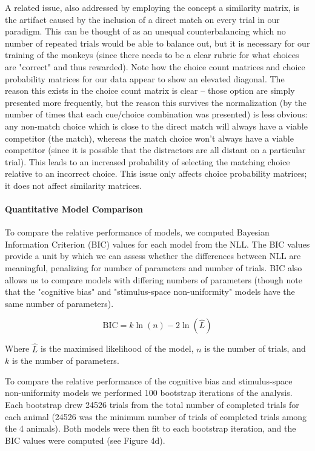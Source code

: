 \documentclass[9pt,biorxiv,lineno,onehalfspacing]{lapreprint}
\begin{document}
\begin{refsection}
A related issue, also addressed by employing the concept a similarity matrix, is the artifact caused by the inclusion of a direct match on every trial in our paradigm. 
This can be thought of as an unequal counterbalancing which no number of repeated trials would be able to balance out, but it is necessary for our training of the monkeys (since there needs to be a clear rubric for what choices are "correct" and thus rewarded).
Note how the choice count matrices and choice probability matrices for our data appear to show an elevated diagonal. 
The reason this exists in the choice count matrix is clear – those option are simply presented more frequently, but the reason this survives the normalization (by the number of times that each cue/choice combination was presented) is less obvious: any non-match choice which is close to the direct match will always have a viable competitor (the match), whereas the match choice won't always have a viable competitor (since it is possible that the distractors are all distant on a particular trial).
This leads to an increased probability of selecting the matching choice relative to an incorrect choice. This issue only affects choice probability matrices; it does not affect similarity matrices.

\paragraph{Quantitative Model Comparison}
To compare the relative performance of models, we computed Bayesian Information Criterion (BIC) values for each model from the NLL. 
The BIC values provide a unit by which we can assess whether the differences between NLL are meaningful, penalizing for number of parameters and number of trials. 
BIC also allows us to compare models with differing numbers of parameters (though note that the "cognitive bias" and "stimulus-space non-uniformity" models have the same number of parameters).

\begin{equation}
    \text{BIC} = k\ln(n)-2\ln(\hat{L})
\end{equation}

Where $\hat{L}$ is the maximised likelihood of the model, $n$ is the number of trials, and $k$ is the number of parameters.

To compare the relative performance of the cognitive bias and stimulus-space non-uniformity models we performed 100 bootstrap iterations of the analysis. 
Each bootstrap drew 24526 trials from the total number of completed trials for each animal (24526 was the minimum number of trials of completed trials among the 4 animals). 
Both models were then fit to each bootstrap iteration, and the BIC values were computed (see Figure 4d).


\end{refsection}
\end{document}
